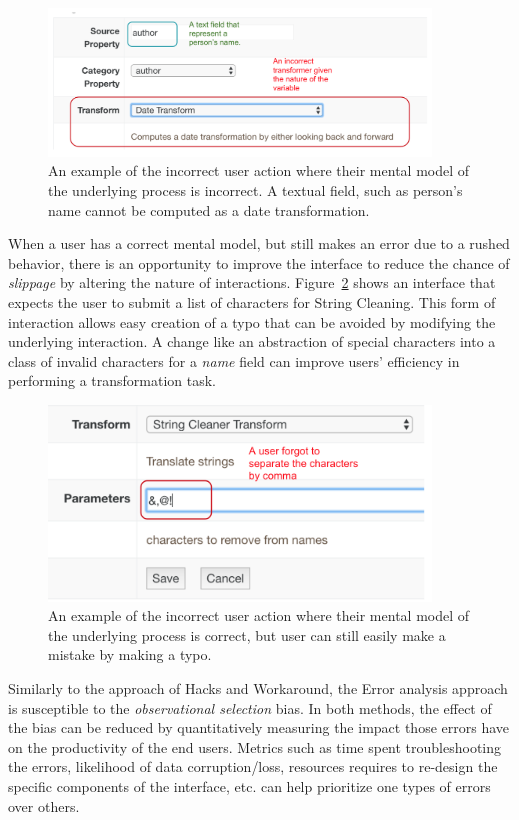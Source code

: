 \documentclass[12pt,letterpaper]{article}
\begin{document}
\begin{figure}[h]
\centering
\includegraphics[width=4in, scale=.3]{mistake.png}
\caption{An example of the incorrect user action where their mental model of the underlying process is incorrect. A textual field, such as person's name cannot be computed as a date transformation.}
\label{fig::5}
\end{figure}

When a user has a correct mental model, but still makes an error due to a rushed behavior, there is an opportunity to improve the interface to reduce the chance of \textit{slippage} by altering the nature of interactions. Figure~\ref{fig::6} shows an interface that expects the user to submit a list of characters for String Cleaning. This form of interaction allows easy creation of a typo that can be avoided by modifying the underlying interaction. A change like an abstraction of special characters into a class of invalid characters for a \textit{name} field can improve users' efficiency in performing a transformation task.

\begin{figure}[h]
\centering
\includegraphics[width=4in, scale=.3]{slip.png}
\caption{An example of the incorrect user action where their mental model of the underlying process is correct, but user can still easily make a mistake by making a typo.}
\label{fig::6}
\end{figure}

Similarly to the approach of Hacks and Workaround, the Error analysis approach is susceptible to the \textit{observational selection} bias. In both methods, the effect of the bias can be reduced by quantitatively measuring the impact those errors have on the productivity of the end users. Metrics such as time spent troubleshooting the errors, likelihood of data corruption/loss, resources requires to re-design the specific components of the interface, etc. can help prioritize one types of errors over others.  
\end{document}
